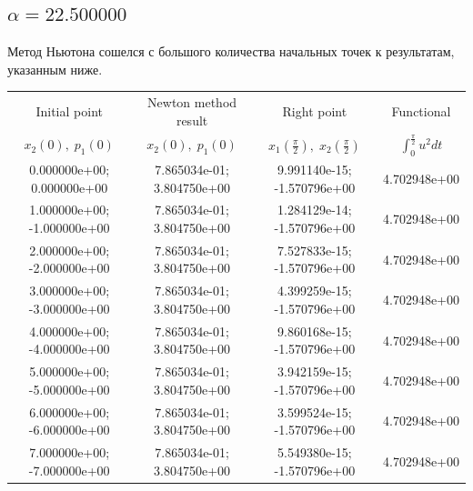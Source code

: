 \documentclass[titlepage]{article}
\def\l{\left}
\def\r{\right}
\begin{document}
\subsection{$\alpha = 22.500000$} 
Метод Ньютона сошелся с большого количества начальных точек к результатам, указанным ниже. \\ 
\begin{tabular}{ | c | c | c | c |} 
\hline 
Initial point  & Newton method result & Right point & Functional 
 \\ $x_2(0), \; p_1(0)$ & $x_2(0), \; p_1(0)$ & $x_1\l(\frac{\pi}{2}\r), \; x_2\l(\frac{\pi}{2}\r)$ & $\int_{0}^{\frac{\pi}{2}}u^2dt$  \\ \hline 
0.000000e+00; 0.000000e+00 & 7.865034e-01; 3.804750e+00 & 9.991140e-15; -1.570796e+00 & 4.702948e+00 \\ \hline 
1.000000e+00; -1.000000e+00 & 7.865034e-01; 3.804750e+00 & 1.284129e-14; -1.570796e+00 & 4.702948e+00 \\ \hline 
2.000000e+00; -2.000000e+00 & 7.865034e-01; 3.804750e+00 & 7.527833e-15; -1.570796e+00 & 4.702948e+00 \\ \hline 
3.000000e+00; -3.000000e+00 & 7.865034e-01; 3.804750e+00 & 4.399259e-15; -1.570796e+00 & 4.702948e+00 \\ \hline 
4.000000e+00; -4.000000e+00 & 7.865034e-01; 3.804750e+00 & 9.860168e-15; -1.570796e+00 & 4.702948e+00 \\ \hline 
5.000000e+00; -5.000000e+00 & 7.865034e-01; 3.804750e+00 & 3.942159e-15; -1.570796e+00 & 4.702948e+00 \\ \hline 
6.000000e+00; -6.000000e+00 & 7.865034e-01; 3.804750e+00 & 3.599524e-15; -1.570796e+00 & 4.702948e+00 \\ \hline 
7.000000e+00; -7.000000e+00 & 7.865034e-01; 3.804750e+00 & 5.549380e-15; -1.570796e+00 & 4.702948e+00 \\ \hline 
\end{tabular} 
\end{document}
